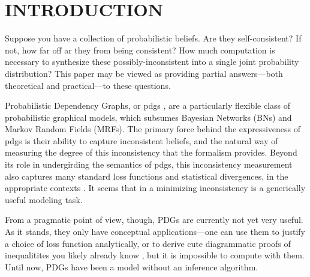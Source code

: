 \documentclass[twoside]{article}
\begin{document}
% 




\section{INTRODUCTION}

Suppose you have a collection of probabilistic beliefs. 
Are they self-consistent? 
If not, how far off ar they from being consistent?
How much computation is necessary to synthesize these possibly-inconsistent into a single joint probability distribution?
This paper may be viewed as providing partial answers---both theoretical and practical---to these questions.


Probabilistic Dependency Graphs, or pdgs \parencite{pdg-aaai},
are a particularly flexible class of probabilistic graphical models, which subsumes Bayesian Networks (BNs) and Markov Random Fields (MRFs).
The primary force behind the expressiveness of pdgs is their ability to capture inconsistent beliefs, and the natural way of measuring the degree of this inconsistency that the formalism provides.
%
Beyond its role in undergirding the semantics of pdgs, 
this inconsistency measurement also captures many standard
loss functions and statistical divergences, in the appropriate contexts
 \parencite{one-true-loss}.
It seems that in a  minimizing inconsistency is a 
generically useful modeling task. 

From a pragmatic point of view, though, PDGs are currently not yet very useful.
As it stands, they only have conceptual applications---one can use them to justify
a choice of loss function analytically, or to derive cute diagrammatic proofs
of inequalitites you likely already know \parencite{one-true-loss},
but it is impossible to compute with them.
Until now, PDGs have been a model without an inference algorithm. 
\end{document}
